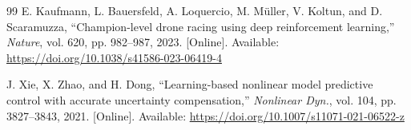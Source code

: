 \begin{thebibliography}{99}
E. Kaufmann, L. Bauersfeld, A. Loquercio, M. M\"uller, V. Koltun, and D. Scaramuzza, ``Champion-level drone racing using deep reinforcement learning,'' \emph{Nature}, vol. 620, pp. 982--987, 2023. [Online]. Available: \url{https://doi.org/10.1038/s41586-023-06419-4}

J. Xie, X. Zhao, and H. Dong, ``Learning-based nonlinear model predictive control with accurate uncertainty compensation,'' \emph{Nonlinear Dyn.}, vol. 104, pp. 3827--3843, 2021. [Online]. Available: \url{https://doi.org/10.1007/s11071-021-06522-z}

\end{thebibliography}

